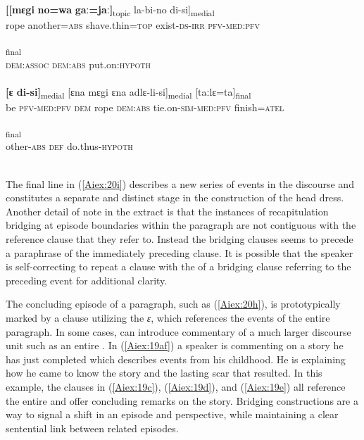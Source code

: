 \documentclass[output=paper]{LSP/langsci}
\begin{document}
\begin{exe}
\begin{xlist}
\ex \label{Aiex:20f}
\gll \textbf{[[mɛgi}	\textbf{no=wa}	\textbf{gaː=jaː]}\textsubscript{topic}	la-bi-no	di-si]\textsubscript{medial}\\
rope	another\textsc{=abs}	shave.thin\textsc{=top}	exist\textsc{-ds-irr}	\textsc{pfv-med:pfv}\\
\glt {}\\
\ex \label{Aiex:20g}
\textsubscript{final}\\
\textsc{dem:assoc}	\textsc{dem:abs}	put.on\textsc{:hypoth}\\
\glt {}\\
\ex \label{Aiex:20h}
\gll \textbf{[ɛ	di-si]}\textsubscript{medial}	[ɛna	mɛgi	ɛna	adlɛ-li-si]\textsubscript{medial}	[taːlɛ=ta]\textsubscript{final}\\
be	\textsc{pfv-med:pfv}	\textsc{dem}	rope	\textsc{dem:abs}	tie.on\textsc{-sim-med:pfv}	finish\textsc{=atel}\\
\glt {}\\
\ex \label{Aiex:20i}
\textsubscript{final}\\
other\textsc{-abs}	\textsc{def}	do.thus\textsc{-hypoth}\\
\glt {}\\
\end{xlist}
\end{exe}

	The final line in (\ref{Aiex:20i}) describes a new series of events in the discourse and constitutes a separate and distinct stage in the construction of the head dress. Another detail of note in the extract is that the instances of recapitulation bridging at episode boundaries within the paragraph are not contiguous with the reference clause that they refer to. Instead the bridging clauses seems to precede a paraphrase of the immediately preceding clause. It is possible that the speaker is self-correcting to repeat a clause with the  of a bridging clause referring to the preceding event for additional clarity.
	

	The concluding episode of a paragraph, such as (\ref{Aiex:20h}), is prototypically marked by a  clause utilizing the  \textit{ɛ}, which references the events of the entire paragraph. In some cases,  can introduce commentary of a much larger discourse unit such as an entire . In (\ref{Aiex:19af}) a speaker is commenting on a story he has just completed which describes events from his childhood. He is explaining how he came to know the story and the lasting scar that resulted. In this example, the  clauses in (\ref{Aiex:19c}), (\ref{Aiex:19d}), and (\ref{Aiex:19e}) all reference the entire  and offer concluding remarks on the story. Bridging constructions are a way to signal a shift in an episode and perspective, while maintaining a clear sentential link between related episodes. 
	
\end{document}
